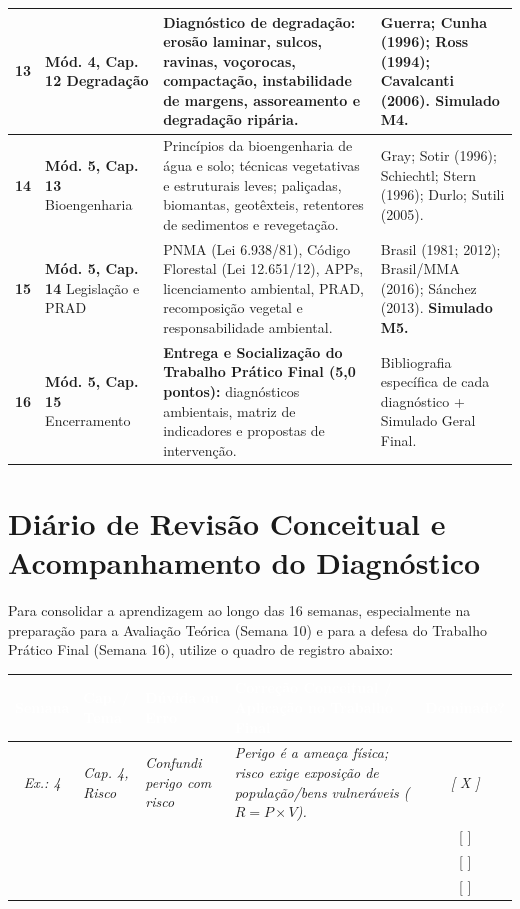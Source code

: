 \begin{longtable}{@{}c p{2.9cm} p{5.5cm} p{4.4cm}@{}}
  \textbf{13} & \textbf{Mód. 4, Cap. 12} \newline Degradação & Diagnóstico de degradação: erosão laminar, sulcos, ravinas, voçorocas, compactação, instabilidade de margens, assoreamento e degradação ripária. & Guerra; Cunha (1996); Ross (1994); Cavalcanti (2006). \textbf{Simulado M4.} \\
  \midrule
  \rowcolor{bgGray}
  \textbf{14} & \textbf{Mód. 5, Cap. 13} \newline Bioengenharia & Princípios da bioengenharia de água e solo; técnicas vegetativas e estruturais leves; paliçadas, biomantas, geotêxteis, retentores de sedimentos e revegetação. & Gray; Sotir (1996); Schiechtl; Stern (1996); Durlo; Sutili (2005). \\
  \textbf{15} & \textbf{Mód. 5, Cap. 14} \newline Legislação e PRAD & PNMA (Lei 6.938/81), Código Florestal (Lei 12.651/12), APPs, licenciamento ambiental, PRAD, recomposição vegetal e responsabilidade ambiental. & Brasil (1981; 2012); Brasil/MMA (2016); Sánchez (2013). \textbf{Simulado M5.} \\
  \rowcolor{bgTeal}
  \textbf{16} & \textbf{Mód. 5, Cap. 15} \newline Encerramento & \textbf{Entrega e Socialização do Trabalho Prático Final (5,0 pontos):} diagnósticos ambientais, matriz de indicadores e propostas de intervenção. & Bibliografia específica de cada diagnóstico + Simulado Geral Final. \\
\end{longtable}
\normalsize

\section*{Diário de Revisão Conceitual e Acompanhamento do Diagnóstico}

Para consolidar a aprendizagem ao longo das 16 semanas, especialmente na preparação para a Avaliação Teórica (Semana 10) e para a defesa do Trabalho Prático Final (Semana 16), utilize o quadro de registro abaixo:

\begin{center}
\renewcommand{\arraystretch}{1.55}
\small
\begin{tabularx}{\textwidth}{|c|p{2.6cm}|p{3.0cm}|X|c|}
  \hline
  \rowcolor{uefsNavy}
  \textcolor{white}{\bfseries Semana} & \textcolor{white}{\bfseries Cap. / Tema} & \textcolor{white}{\bfseries Dúvida ou Erro} & \textcolor{white}{\bfseries Correção Conceitual / Aplicação no Trabalho Final} & \textcolor{white}{\bfseries Dominado?} \\
  \hline
  \textit{Ex.: 4} & \textit{Cap. 4, Risco} & \textit{Confundi perigo com risco} & \textit{Perigo é a ameaça física; risco exige exposição de população/bens vulneráveis ($R = P \times V$).} & \textit{[ X ]} \\
  \hline
  & & & & [ \quad ] \\
  \hline
  & & & & [ \quad ] \\
  \hline
  & & & & [ \quad ] \\
  \hline
\end{tabularx}
\end{center}
